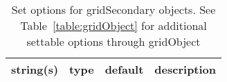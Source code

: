 \begin{table}[ht]
\centering
\begin{tabular}{p{5cm} c c p{7cm}}
\hline
string(s) & type & default & description \\
\hline
\hline
\end{tabular}
\caption{Set options for gridSecondary objects. See Table~\ref{table:gridObject} for additional settable options through gridObject}
\label{table:gridSecondary}
\end{table}
